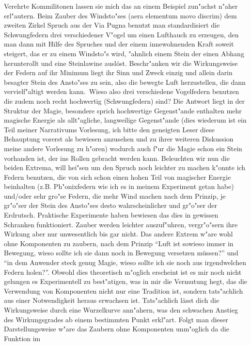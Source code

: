 \documentclass[a5paper,8pt]{book}
\begin{document}
Verehrte Kommilitonen lassen sie mich das an einem Beispiel zun"achst n"aher erl"autern. Beim Zauber des Windsto"ses (aera elementum movo discrim) dem zweiten Zirkel Spruch 
aus der Via Pugna benutzt man standardisiert die Schwungfedern drei verschiedener V"ogel um einen Lufthauch zu erzeugen, den man dann mit Hilfe des Spruches und 
der einem innewohnenden Kraft soweit steigert, das er zu einem Windsto"s wird, "ahnlich einem Stein der einen Abhang herunterollt und eine Steinlawine auslöst. 
Beschr"anken wir die Wirkungsweise der Federn auf ihr Minimum liegt ihr Sinn und Zweck einzig und allein darin besagter Stein des Ansto"ses zu sein, also die bewegte 
Luft herzustellen, die dann vervielf"altigt werden kann.\ 
Wieso also drei verschiedene Vogelfedern benutzen die zudem noch recht hochwertig (Schwungfedern) sind? Die Antwort liegt in der Struktur der Magie, besondere sprich 
hochwertige Gegenst"ande enthalten mehr magische Energie als allt"agliche, langweilige Gegenst"ande (dies wiederum ist ein Teil meiner 
Narrativums Vorlesung, ich bitte den geneigten Leser diese Behauptung vorerst als bewiesen anzusehen 
und zu ihrer weiteren Diskussion meine andere Vorlesung zu h"oren) wodurch auch f"ur die Magie schon ein Stein vorhanden ist, der ins Rollen gebracht werden kann.
Beleuchten wir nun die beiden Extrema, will hei"sen um den Spruch noch leichter zu machen k"onnte ich 
Federn benutzen, die von sich schon einen hohen Teil von magischer Energie beinhalten (z.B. Ph"onixfedern wie ich es in meinem Experiment getan habe) und/oder sehr 
gro"se Federn, die mehr Wind machen nach dem Prinzip, je gr"o"ser der Stein des Ansto"ses desto wahrscheinlicher und gr"o"ser der Erdrutsch. Praktische Experimente 
haben bewiesen das dies in gewissen Schranken funktioniert. Zauber werden leichter auszuf"uhren, vergr"o"sern ihre Wirkung aber nur unwesentlich bis gar nicht.
Das andere Extrem w"are wohl ohne Komponenten zu zaubern, nach dem Prinzip ``Luft ist sowieso immer in 
Bewegung, wieso sollte ich sie dann noch in Bewegung versetzen müssen?'' und ``in dem Anwender steck genug Magie, wieso sollte ich sie noch aus irgendwelchen Federn holen?''. 
Obwohl dies theoretisch m"oglich erscheint ist es mir noch nicht gelungen es Experimentell zu best"atigen, was in mir die Vermutung hegt, das die Verwendung von Komponenten nicht 
nur eine Tradition ist, sondern tats"achlich aus einer Notwendigkeit heraus erwachsen ist. Tats"achlich lässt dich die Wirkungsweise durch eine Wurzelkurve ann"ahern, was den 
schwachen Anstieg des Wirkungsgrades ab einem bestimmten Punkt erkl"art. Folgt man dieser Darstellungsweise w"are das Zaubern ohne Komponenten unm"oglich da die Funktion im 
\end{document}
